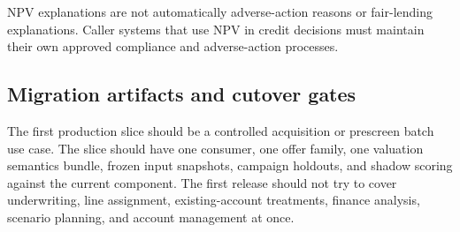 \documentclass[11pt]{article}
\newcommand{\1}{\mathbf{1}}
\begin{document}
NPV explanations are not automatically adverse-action reasons or fair-lending
explanations. Caller systems that use NPV in credit decisions must maintain
their own approved compliance and adverse-action processes.

\subsection{Migration artifacts and cutover gates}
\label{subsec:migration-artifacts}

The first production slice should be a controlled acquisition or prescreen
batch use case. The slice should have one consumer, one offer family, one
valuation semantics bundle, frozen input snapshots, campaign holdouts, and
shadow scoring against the current component. The first release should not try
to cover underwriting, line assignment, existing-account treatments, finance
analysis, scenario planning, and account management at once.
\end{document}
